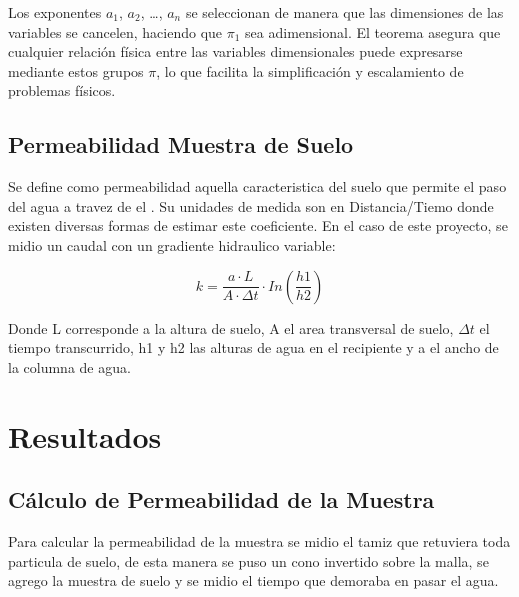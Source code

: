 Los exponentes $a_1$, $a_2$, \ldots, $a_n$ se seleccionan de manera que las dimensiones de las variables se cancelen, haciendo que $\pi_1$ sea adimensional. El teorema asegura que cualquier relación física entre las variables dimensionales puede expresarse mediante estos grupos $\pi$, lo que facilita la simplificación y escalamiento de problemas físicos.

\subsection{Permeabilidad Muestra de Suelo}

Se define como permeabilidad aquella caracteristica del suelo que permite el paso del agua a travez de el \textbf{\cite{permeabilidad_suelos}}. Su unidades de medida son en Distancia/Tiemo donde existen diversas formas de estimar este coeficiente. En el caso de este proyecto, se midio un caudal con un gradiente hidraulico variable:

\begin{equation}
    k = \frac{a \cdot L}{A \cdot \Delta t} \cdot In(\frac{h1}{h2})
\end{equation}

Donde L corresponde a la altura de suelo, A el area transversal de suelo, $\Delta t$ el tiempo transcurrido, h1 y h2 las alturas de agua en el recipiente y a el ancho de la columna de agua.

\section{Resultados}

\subsection{Cálculo de Permeabilidad de la Muestra}

Para calcular la permeabilidad de la muestra se midio el tamiz que retuviera toda particula de suelo, de esta manera se puso un cono invertido sobre la malla, se agrego la muestra de suelo y se midio el tiempo que demoraba en pasar el agua. 

